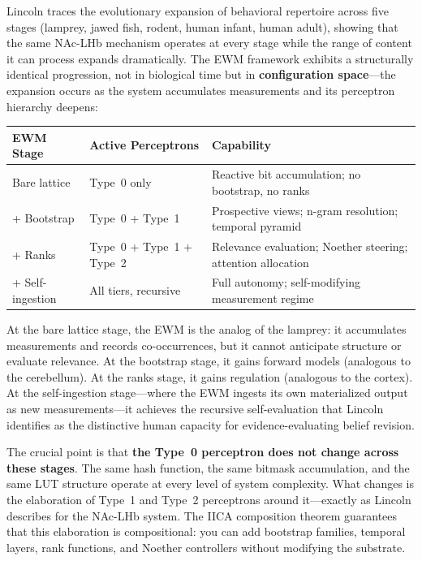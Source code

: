 \documentclass[11pt,a4paper]{article}
\theoremstyle{remark}
\begin{document}
Lincoln traces the evolutionary expansion of behavioral repertoire across five
stages (lamprey, jawed fish, rodent, human infant, human adult), showing that
the same NAc-LHb mechanism operates at every stage while the range of content it
can process expands dramatically. The EWM framework exhibits a structurally
identical progression, not in biological time but in \textbf{configuration
space}---the expansion occurs as the system accumulates measurements and its
perceptron hierarchy deepens:

\begin{center}
\begin{tabular}{@{}lll@{}}
\toprule
\textbf{EWM Stage} & \textbf{Active Perceptrons} & \textbf{Capability} \\
\midrule
Bare lattice    & Type~0 only &
  Reactive bit accumulation; no bootstrap, no ranks \\
+ Bootstrap     & Type~0 + Type~1 &
  Prospective views; n-gram resolution; temporal pyramid \\
+ Ranks         & Type~0 + Type~1 + Type~2 &
  Relevance evaluation; Noether steering; attention allocation \\
+ Self-ingestion & All tiers, recursive &
  Full autonomy; self-modifying measurement regime \\
\bottomrule
\end{tabular}
\end{center}

At the bare lattice stage, the EWM is the analog of the lamprey: it accumulates
measurements and records co-occurrences, but it cannot anticipate structure or
evaluate relevance. At the bootstrap stage, it gains forward models (analogous
to the cerebellum). At the ranks stage, it gains regulation (analogous to the
cortex). At the self-ingestion stage---where the EWM ingests its own
materialized output as new measurements---it achieves the recursive
self-evaluation that Lincoln identifies as the distinctive human capacity for
evidence-evaluating belief revision.

The crucial point is that \textbf{the Type~0 perceptron does not change across
these stages}. The same hash function, the same bitmask accumulation, and the
same LUT structure operate at every level of system complexity. What changes is
the elaboration of Type~1 and Type~2 perceptrons around it---exactly as Lincoln
describes for the NAc-LHb system. The IICA composition theorem guarantees that
this elaboration is compositional: you can add bootstrap families, temporal
layers, rank functions, and Noether controllers without modifying the substrate.
\end{document}
